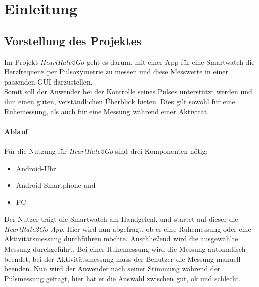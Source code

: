 \newpage
\section{Einleitung} \label{sec:Einleitung}
\subsection{Vorstellung des Projektes} \label{sec:Vorstellung des Projektes}
Im Projekt \textit{HeartRate2Go} geht es darum, mit einer App für eine Smartwatch die Herzfrequenz per Pulsoxymetrie zu messen und diese Messwerte in einer passenden GUI darzustellen. \\[0.5cm]
Somit soll der Anwender bei der Kontrolle seines Pulses unterstützt werden und ihm einen guten, verständlichen Überblick bieten. Dies gilt sowohl für eine Ruhemessung, als auch für eine Messung während einer Aktivität. \\
\\
\textbf{Ablauf}\\
\\
Für die Nutzung für \textit{HeartRate2Go} sind drei Komponenten nötig:\\
\begin{itemize}
	\item Android-Uhr
	\item Android-Smartphone und
	\item PC\\
\end{itemize}
Der Nutzer trägt die Smartwatch am Handgelenk und startet auf dieser die \textit{HeartRate2Go-App}. Hier wird nun abgefragt, ob er eine Ruhemessung oder eine Aktivitätsmessung durchführen möchte. Anschließend wird die ausgewählte Messung durchgeführt. Bei einer Ruhemessung wird die Messung automatisch beendet, bei der Aktivitätsmessung muss der Benutzer die Messung manuell beenden. 
Nun wird der Anwender nach seiner Stimmung während der Pulsmessung gefragt, hier hat er die Auswahl zwischen gut, ok und schlecht. \\
